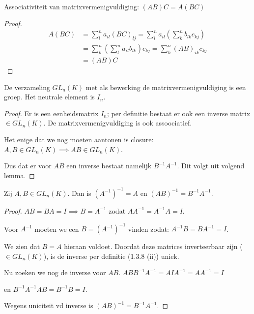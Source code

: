 \begin{lemma}
    Associativiteit van matrixvermenigvuldiging: \((AB)C = A(BC)\)
\end{lemma}
\begin{proof}
    \begin{align*}
        A(BC) &= \sum_{l}^{n} a_{il}\left(BC\right)_{lj}
        = \sum_{l}^{n} a_{il} \left(\sum_{k}^n b_{lk}c_{kj}\right)  \\
        &= \sum_{k}^n \left(  \sum_{l}^{n} a_{il}  b_{lk} \right) c_{kj}
        = \sum_{k}^n  \left( AB \right)_{ik} c_{kj} \\
        &= (AB)C
    \end{align*}
\end{proof}

\begin{lemma}
    De verzameling \(GL_n(K)\) met als bewerking de matrixvermenigvuldiging is een groep.
    Het neutrale element is \(I_n\).
\end{lemma}
\begin{proof}
    Er is een eenheidsmatrix \(I_n\);
    per definitie bestaat er ook een inverse matrix \(\in GL_n(K)\).
    De matrixvermenigvuldiging is ook assoociatief.

    Het enige dat we nog moeten aantonen is closure:
    \(A,B \in GL_n(K) \implies AB \in GL_n(K)\).

    Dus dat er voor \( AB\) een inverse bestaat namelijk \(B^{-1}A^{-1}\).
    Dit volgt uit volgend lemma.

\end{proof}

\begin{lemma}
    Zij \(A, B \in GL_n (K)\). Dan is \((A^{-1})^{-1} = A \) en \((AB)^{-1} = B^{-1}A^{-1}\).
\end{lemma}
\begin{proof}
    \(AB = BA = I \implies B = A^{-1}\)
    zodat \(AA^{-1} = A^{-1}A = I\).

    Voor \(A^{-1}\) moeten we een \(B = (A^{-1})^{-1}\) vinden zodat:
    \(A^{-1} B = B A^{-1} = I\).

    We zien dat \(B = A\) hieraan voldoet. Doordat deze matrices inverteerbaar zijn (\(\in GL_n(K)\)),
    is de inverse per definitie (1.3.8 (ii)) uniek.

    Nu zoeken we nog de inverse voor \(AB\).
    \(ABB^{-1}A^{-1} = AIA^{-1} = AA^{-1} = I\)

    en
    \(B^{-1}A^{-1}AB = B^{-1}B = I\).

    Wegens uniciteit vd inverse is \((AB)^{-1} = B^{-1}A^{-1}\).

\end{proof}

